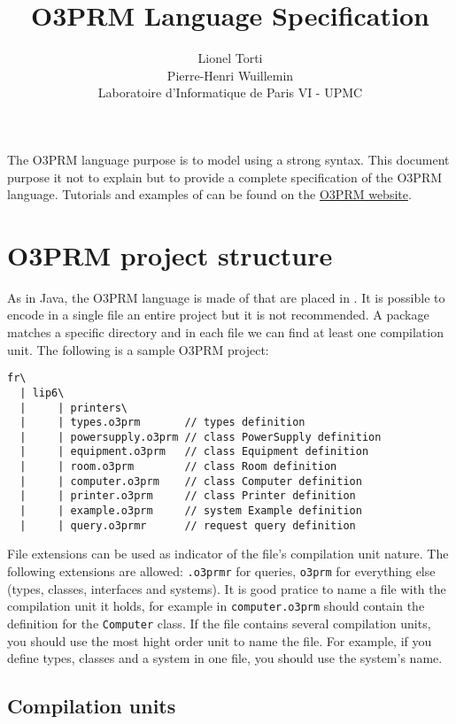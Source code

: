 \documentclass[12pt,a4paper]{article}
\title{O3PRM Language Specification}
\author{Lionel Torti \\ Pierre-Henri Wuillemin \\ Laboratoire d'Informatique de Paris VI - UPMC}
\begin{document}
\maketitle

The O3PRM language purpose is to model \PRMs{} using a strong \oo{} syntax. This
document purpose it not to explain \PRMs{} but to provide a complete
specification of the O3PRM language. Tutorials and examples of \PRMs{} can be
found on the \href{http://o3prm.lip6.fr/}{O3PRM website}.

\section{O3PRM project structure}

As in Java, the O3PRM language is made of  that are placed
in . It is possible to encode in a single file an entire project but
it is not recommended. A package matches a specific directory and in each file
we can find at least one compilation unit. The following is a sample O3PRM
project:

\begin{small}
\begin{verbatim}
fr\
  | lip6\
  |     | printers\
  |     | types.o3prm       // types definition
  |     | powersupply.o3prm // class PowerSupply definition
  |     | equipment.o3prm   // class Equipment definition
  |     | room.o3prm        // class Room definition
  |     | computer.o3prm    // class Computer definition
  |     | printer.o3prm     // class Printer definition
  |     | example.o3prm     // system Example definition
  |     | query.o3prmr      // request query definition
\end{verbatim}
\end{small}

File extensions can be used as indicator of the file's compilation unit nature.
The following extensions are allowed: \verb+.o3prmr+ for queries,  \verb+o3prm+
for everything else (types, classes, interfaces and systems).  It is good
pratice to name a file with the compilation unit it holds, for example in
\verb+computer.o3prm+ should contain the definition for the \verb+Computer+
class. If the file contains several compilation units, you should use the most
hight order unit to name the file. For example, if you define types, classes
and a system in one file, you should use the system's name.

\subsection*{Compilation units}
\end{document}
